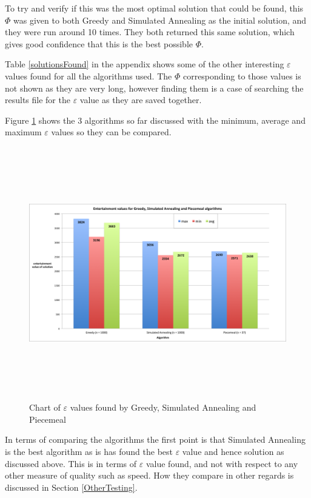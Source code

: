 \documentclass[12pt]{report}
\begin{document}
To try and verify if this was the most optimal solution that could be found, this $\Phi$ was given to both Greedy and Simulated Annealing as the initial solution, and they were run around 10 times. They both returned this same solution, which gives good confidence that this is the best possible $\Phi$.

Table \ref{solutionsFound} in the appendix shows some of the other interesting $\varepsilon$ values found for all the algorithms used. The $\Phi$ corresponding to those values is not shown as they are very long, however finding them is a case of searching the results file for the $\varepsilon$ value as they are saved together.

Figure \ref{eScreenshot} shows the 3 algorithms so far discussed with the minimum, average and maximum $\varepsilon$ values so they can be compared.

\begin{figure}[H]
\centering
\includegraphics[width=18cm, height=11cm]{./entertainmentValues}
\caption{Chart of $\varepsilon$ values found by Greedy, Simulated Annealing and Piecemeal}
\label{eScreenshot}
\end{figure}

In terms of comparing the algorithms the first point is that Simulated Annealing is the best algorithm as is has found the best $\varepsilon$ value and hence solution as discussed above. This is in terms of $\varepsilon$ value found, and not with respect to any other measure of quality such as speed. How they compare in other regards is discussed in Section \ref{OtherTesting}.
\end{document}
